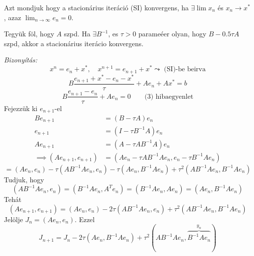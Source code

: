 \begin{definition}
    Azt mondjuk hogy a stacionárius iteráció (SI) konvergens, ha $\exists \lim x_{n}$ és $x_{n}\to x^{*}$, azaz $\lim_{ n \to \infty }e_{n} = 0$.
\end{definition}

\begin{allitas}
    Tegyük föl, hogy $A$ szpd. Ha $\exists B^{-1}$, es $\tau > 0$  parameéer olyan, hogy $B - 0.5 \tau A$ szpd, akkor a stacionárius iterácio konvergens.
\end{allitas}
\textit{Bizonyítás:}
\begin{equation*}
    x^{n} = e_{n} + x^{*}, \quad x^{n+1} = e_{n+1} + x^{*} \leadsto \text{ (SI)-be beirva}
\end{equation*}
\begin{equation*}
    B \frac{e_{n+1} + x^{*} - e_{n} - x^{*}}{\tau} + Ae_{n} + Ax^{*} = b
\end{equation*}
\begin{equation*}
    B \frac{e_{n+1} - e_{n}}{\tau} + Ae_{n} = 0 \qquad \text{(3) hibaegyenlet}
\end{equation*}
Fejezzük ki $e_{n+1}$-el
\begin{align*}
    Be_{n+1} & = (B - \tau A)e_{n} \\
    e_{n+1} & = (I - \tau B^{-1}A)e_{n} \\
    Ae_{n+1} & = (A - \tau AB^{-1}A)e_{n} \\
    \implies (Ae_{n+1}, e_{n+1}) & = (Ae_{n} - \tau AB^{-1}Ae_{n}, e_{n} - \tau B^{-1}Ae_{n})
\end{align*}
\begin{equation*}
    = (Ae_{n}, e_{n}) - \tau(AB^{-1}Ae_{n}, e_{n}) - \tau(Ae_{n}, B^{-1}Ae_{n}) + \tau ^{2}(AB^{-1}Ae_{n}, B^{-1}Ae_{n})
\end{equation*}
Tudjuk, hogy
\begin{equation*}
    (AB^{-1}Ae_{n}, e_{n}) = (B^{-1}Ae_{n}, A^{T}e_{n}) = (B^{-1}Ae_{n}, Ae_{n}) = (Ae_{n}, B^{-1}Ae_{n})
\end{equation*}
Tehát
\begin{equation*}
    (Ae_{n+1},e_{n+1}) = (Ae_{n}, e_{n}) - 2\tau(AB^{-1}Ae_{n}, e_{n}) + \tau ^{2}(AB^{-1}Ae_{n}, B^{-1}Ae_{n})
\end{equation*}
Jelölje $J_{n} = (Ae_{n}, e_{n})$. Ezzel
\begin{equation*}
    J_{n+1} = J_{n} - 2\tau(Ae_{n}, B^{-1}Ae_{n}) + \tau ^{2}(AB^{-1}Ae_{n}, \stackrel{y_{n}}{\overbrace{ B^{-1}Ae_{n}}})
\end{equation*}
